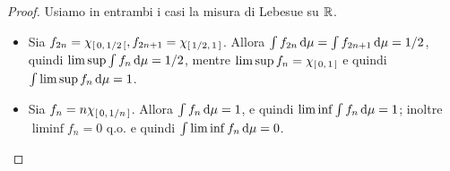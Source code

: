 \documentclass[../EserciziIstituzioniAnalisi.tex]{subfiles}
\begin{document}
\begin{proof}
  Usiamo in entrambi i casi la misura di Lebesue su $\mathbb R$.
  \begin{itemize}
    \item Sia $f_{2n}=\chi_{\left[\,0,\,1/2\,\right[},f_{2n+1}=\chi_{\left[\,1/2,\,1\,\right]}$. Allora $\int f_{2n} \,\mathrm d \mu=\int f_{2n+1} \,\mathrm d \mu=1/2$, quindi $\limsup \int f_n \,\mathrm d \mu=1/2$, mentre $\limsup f_n=\chi_{\left[\,0,\,1\,\right]}$ e quindi $\int\limsup f_n \,\mathrm d \mu=1$.
    \item Sia $f_n=n \chi_{\left[\,0,\,1/n\,\right]}$. Allora $\int f_n \,\mathrm d \mu=1$, e quindi $\liminf \int f_n \,\mathrm d \mu=1$; inoltre $\liminf f_n=0$ q.o. e quindi $\int\liminf f_n\,\mathrm d \mu=0$.
  \end{itemize}
\end{proof}
\end{document}

